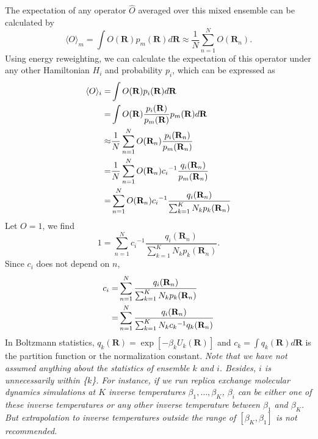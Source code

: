 The expectation of any operator $\hat{O}$ averaged over this mixed ensemble can be calculated by
\begin{equation}
\langle O\rangle_m=\int O(\mathbf{R})p_m(\mathbf{R})d\mathbf{R}\approx\frac 1N \sum\limits_{n=1}^NO(\mathbf{R}_n).
\end{equation}
Using energy reweighting\cite{TorrieJComputP1977}, we can calculate the expectation of this operator under any other Hamiltonian $H_i$ and probability $p_i$, which can be expressed as
\begin{align}
\langle O\rangle_i=&\int O(\mathbf{R})p_i(\mathbf{R})d\mathbf{R}\notag\\
                  =&\int O(\mathbf{R})\frac{p_i(\mathbf{R})}{p_m(\mathbf{R})}p_m(\mathbf{R})d\mathbf{R}\notag\\
                  \approx&\frac 1N\sum\limits_{n=1}^N O(\mathbf{R}_n)\frac{p_i(\mathbf{R}_n)}{p_m(\mathbf{R}_n)}\notag\\
                  =&\frac 1N\sum\limits_{n=1}^N O(\mathbf{R}_n){c_i}^{-1}\frac{q_i(\mathbf{R}_n)}{p_m(\mathbf{R}_n)}\notag\\
                  =&\sum\limits_{n=1}^N O(\mathbf{R}_n){c_i}^{-1}\frac{q_i(\mathbf{R}_n)}{\sum_{k=1}^{K}N_kp_k(\mathbf{R}_n)}
                  \label{Eq:FEM:MBAR:Oexpect}
\end{align}
Let $O=1$, we find
\begin{equation}
1=\sum\limits_{n=1}^N {c_i}^{-1}\frac{q_i(\mathbf{R}_n)}{\sum_{k=1}^{K}N_kp_k(\mathbf{R}_n)}.
\end{equation}
Since $c_i$ does not depend on $n$,
\begin{align}
c_i=&\sum\limits_{n=1}^N \frac{q_i(\mathbf{R}_n)}{\sum_{k=1}^{K}N_kp_k(\mathbf{R}_n)}\notag\\
   =&\sum\limits_{n=1}^N \frac{q_i(\mathbf{R}_n)}{\sum_{k=1}^{K}N_k{c_k}^{-1}q_k(\mathbf{R}_n)}
   \label{Eq:FEM:MBAR:c_i}
\end{align}
In Boltzmann statistics, $q_k(\mathbf{R})=\exp{\left[-\beta_kU_k(\mathbf{R})\right]}$ and $c_k=\int q_k(\mathbf{R})d\mathbf{R}$ is the partition function or the normalization constant. \textit{Note that we have not assumed anything about the statistics of ensemble $k$ and $i$. Besides, $i$ is unnecessarily within \{$k$\}. For instance, if we run replica exchange molecular dynamics simulations at $K$ inverse temperatures $\beta_1,\dots,\beta_K$, $\beta_i$ can be either one of these inverse temperatures or any other inverse temperature between $\beta_1$ and $\beta_K$. But extrapolation to inverse temperatures outside the range of $\left[\beta_K,\beta_1\right]$ is not recommended.}

